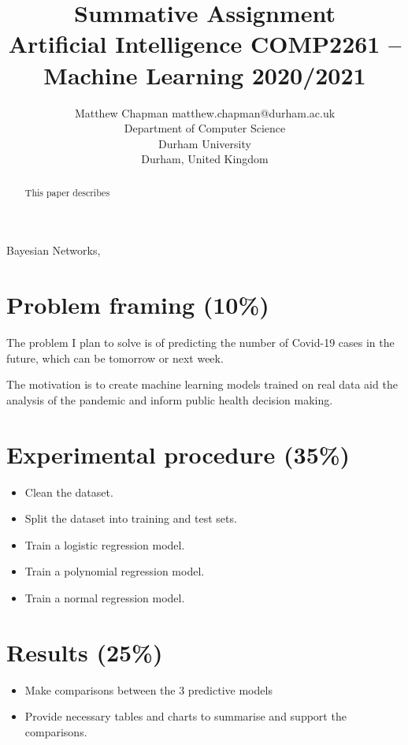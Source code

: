 \documentclass[twoside,11pt]{article}
\begin{document}
\title{Summative Assignment\\ 
Artificial Intelligence COMP2261 –\\
Machine Learning 2020/2021}

\author{\name Matthew Chapman \email matthew.chapman@durham.ac.uk \\
       \addr Department of Computer Science\\
       Durham University\\
       Durham, United Kingdom}

\maketitle

\begin{abstract}%
This paper describes
\end{abstract}

\begin{keywords}
  Bayesian Networks,
\end{keywords}

\cite{kramer1991nonlinear}

\section{Problem framing (10\%)}
The problem I plan to solve is of predicting the number of Covid-19 cases in the future, which can be tomorrow or next week. 

The motivation is to create machine learning models trained on real data aid the analysis of the pandemic and inform public health decision making.   

\section{Experimental procedure (35\%)}
\begin{itemize}
    \item Clean the dataset.
    \item Split the dataset into training and test sets.
    \item Train a logistic regression model.
    \item Train a polynomial regression model.
    \item Train a normal regression model.
\end{itemize}

\section{Results (25\%)}
\begin{itemize}
    \item Make comparisons between the 3 predictive models
    \item Provide necessary tables and charts to summarise and support the comparisons.
\end{itemize}
\end{document}
